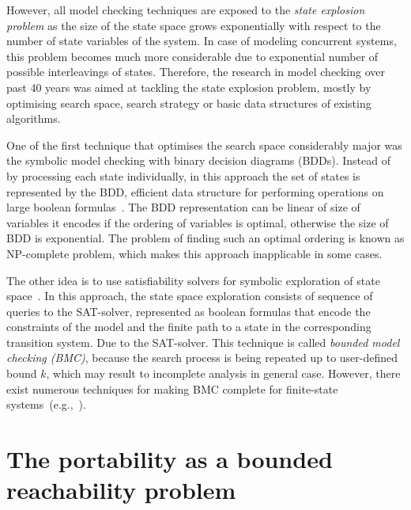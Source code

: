 However, all model checking techniques are exposed to the \textit{state explosion problem} as the size of the state space grows exponentially with respect to the number of state variables of the system. In case of modeling concurrent systems, this problem becomes much more considerable due to exponential number of possible interleavings of states.
Therefore, the research in model checking over past 40 years was aimed at tackling the state explosion problem, mostly by optimising search space, search strategy or basic data structures of existing algorithms.

One of the first technique that optimises the search space considerably major was the symbolic model checking with binary decision diagrams (BDDs). Instead of by processing each state individually, in this approach the set of states is represented by the BDD, efficient data structure for performing operations on large boolean formulas~\cite{clarke2012model}.
The BDD representation can be linear of size of variables it encodes if the ordering of variables is optimal, otherwise the size of BDD is exponential. The problem of finding such an optimal ordering is known as NP-complete problem, which makes this approach inapplicable in some cases.

The other idea is to use satisfiability solvers for symbolic exploration of state space~\cite{clarke2001bounded}. In this approach, the state space exploration consists of sequence of queries to the SAT-solver, represented as boolean formulas that encode the constraints of the model and the finite path to a state in the corresponding transition system.  
Due to the SAT-solver. This technique is called \textit{bounded model checking (BMC)}, because the search process is being repeated up to user-defined bound $k$, which may result to incomplete analysis in general case. However, there exist numerous techniques for making BMC complete for finite-state systems~(e.g.,~\cite{shtrichman2000tuning}).


\section{The portability as a bounded reachability problem}
\label{ch:port:enc}


